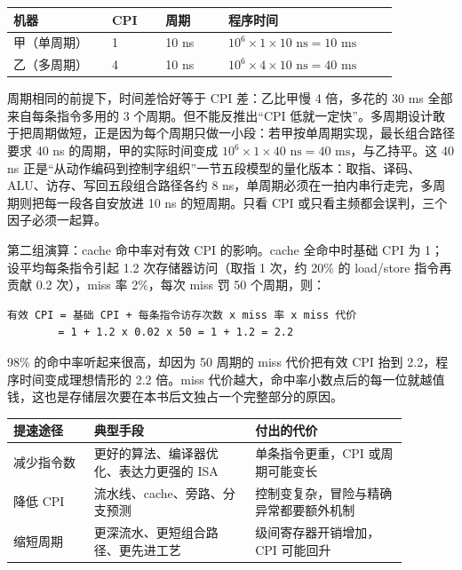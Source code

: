 \begin{longtable}{L{0.22\linewidth}L{0.12\linewidth}L{0.14\linewidth}L{0.38\linewidth}}
\toprule
机器 & CPI & 周期 & 程序时间 \\
\midrule
甲（单周期） & 1 & 10 ns & $10^6 \times 1 \times 10\text{ ns} = 10\text{ ms}$ \\\tablerowrule
乙（多周期） & 4 & 10 ns & $10^6 \times 4 \times 10\text{ ns} = 40\text{ ms}$ \\
\bottomrule
\end{longtable}

周期相同的前提下，时间差恰好等于 CPI 差：乙比甲慢 4 倍，多花的 30 ms 全部来自每条指令多用的 3 个周期。但不能反推出“CPI 低就一定快”。多周期设计敢于把周期做短，正是因为每个周期只做一小段：若甲按单周期实现，最长组合路径要求 40 ns 的周期，甲的实际时间变成 $10^6 \times 1 \times 40\text{ ns} = 40\text{ ms}$，与乙持平。这 40 ns 正是“从动作编码到控制字组织”一节五段模型的量化版本：取指、译码、ALU、访存、写回五段组合路径各约 8 ns，单周期必须在一拍内串行走完，多周期则把每一段各自安放进 10 ns 的短周期。只看 CPI 或只看主频都会误判，三个因子必须一起算。

第二组演算：cache 命中率对有效 CPI 的影响。cache 全命中时基础 CPI 为 1；设平均每条指令引起 1.2 次存储器访问（取指 1 次，约 20\% 的 load/store 指令再贡献 0.2 次），miss 率 2\%，每次 miss 罚 50 个周期，则：

\begin{lstlisting}
有效 CPI = 基础 CPI + 每条指令访存次数 x miss 率 x miss 代价
        = 1 + 1.2 x 0.02 x 50 = 1 + 1.2 = 2.2
\end{lstlisting}

98\% 的命中率听起来很高，却因为 50 周期的 miss 代价把有效 CPI 抬到 2.2，程序时间变成理想情形的 2.2 倍。miss 代价越大，命中率小数点后的每一位就越值钱，这也是存储层次要在本书后文独占一个完整部分的原因。

\begin{longtable}{L{0.18\linewidth}L{0.36\linewidth}L{0.34\linewidth}}
\toprule
提速途径 & 典型手段 & 付出的代价 \\
\midrule
减少指令数 & 更好的算法、编译器优化、表达力更强的 ISA & 单条指令更重，CPI 或周期可能变长 \\\tablerowrule
降低 CPI & 流水线、cache、旁路、分支预测 & 控制变复杂，冒险与精确异常都要额外机制 \\\tablerowrule
缩短周期 & 更深流水、更短组合路径、更先进工艺 & 级间寄存器开销增加，CPI 可能回升 \\
\bottomrule
\end{longtable}

